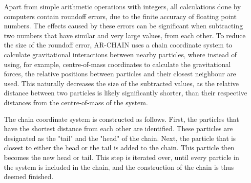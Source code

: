 \documentclass[english, twoside]{HYgradu}
\begin{document}
Apart from simple arithmetic operations with integers, all calculations done by computers contain roundoff errors, due to the finite accuracy of floating point numbers. The effects caused by these errors can be significant when subtracting two numbers that have similar and very large values, from each other. To reduce the size of the roundoff error, AR-CHAIN uses a chain coordinate system to calculate gravitational interactions between nearby particles, where instead of using, for example, centre-of-mass coordinates to calculate the gravitational forces, the relative positions between particles and their closest neighbour are used. This naturally decreases the size of the subtracted values, as the relative distance between two particles is likely significantly shorter, than their respective distances from the centre-of-mass of the system.

The chain coordinate system is constructed as follows. First, the particles that have the shortest distance from each other are identified. These particles are designated as the "tail" and the "head" of the chain. Next, the particle that is closest to either the head or the tail is added to the chain. This particle then becomes the new head or tail. This step is iterated over, until every particle in the system is included in the chain, and the construction of the chain is thus deemed finished.
\end{document}

